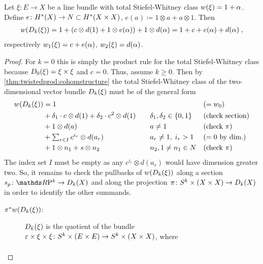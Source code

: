 \begin{Cor}\label{cor:twistedprod:swlinebdl}
  Let $\xi\colon E\to X$ be a line bundle with total Stiefel-Whitney
  class ${w}(\xi)=1+\alpha$.
  Define $e\colon H^*(X)\to N\subset H^*(X\times X)$,
  $e(a)\coloneqq 1\otimes a+a\otimes 1$.
  Then
  \begin{gather*}
    {w}(D_{k}({\xi})) = 1+ (c\otimes d(1)+1\otimes
    e(\alpha)) + 1\otimes d(\alpha)
    = 1+c+e(\alpha)+d(\alpha)
    \;,
  \end{gather*}
  respectively ${w_{1}}(\xi) = c+e(\alpha)$, ${w_{2}}(\xi)=d(\alpha)$.
  \begin{proof}
    For $k=0$ this is simply the product rule for the total
    Stiefel-Whitney class because $D_{0}({\xi})=\xi\times\xi$
    and $c=0$. Thus, assume $k\geq0$.
    Then by \autoref{thm:twistedprod:cohomstructure} the total
    Stiefel-Whitney class of the two-dimensional vector bundle
    $D_{k}({\xi})$ must be of the general form
    \begin{align*}
      {w}(D_{k}({\xi}))
      &=
        1 &\quad&&&{(=w_{0})} \\
      &+ \delta_1\cdot c\otimes d(1) + \delta_2\cdot c^2\otimes d(1)
          &&\delta_1,\delta_2\in\{0,1\}
            &&{(\text{check section})}\\
      &+ 1\otimes d(a)
          &&a \neq 1
                &&{(\text{check $\pi$})} \\
      &+ {\textstyle \sum_{r\in I} c^{i_r}\otimes d(a_r)}
          &&a_r\neq 1,\; i_r>1
            &&{(=0\text{ by dim.})} \\
      &+ 1\otimes n_1 + s\otimes n_2
          &&n_2, 1\neq n_1\in N
                &&{(\text{check $\pi$})}
    \end{align*}
    The index set $I$ must be empty as any $c^{i_r}\otimes d(a_r)$
    would have dimension greater two.
    So, it remains to check the pullbacks of ${w}(D_{k}({\xi}))$
    along a section $s_p\colon\RP k\to\Twistedprod{k}{X}$ and along
    the projection
    $\pi\colon S^{k}\times(X\times X)\to D_{k}({X})$
    in order to identify the other summands.
    \begin{description}
    \item[${\pi}^*{w}(D_{k}({\xi}))$:]
      $D_{k}({\xi})$ is the quotient of the bundle
      $\varepsilon\times\xi\times\xi\colon
      S^{k}\times(E\times E)\to S^{k}\times(X\times X)$, where
      \begin{gather*}

\end{gather*}
\end{description}
\end{proof}
\end{Cor}
